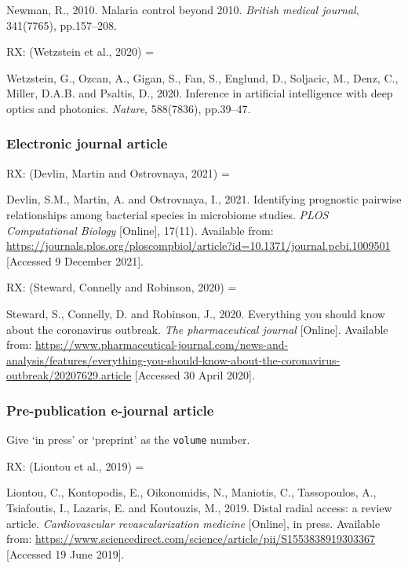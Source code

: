 Newman, R., 2010. Malaria control beyond 2010. \emph{British medical journal}, 341(7765), pp.157--208.


RX: (Wetzstein et al., 2020) = \cite{wetzstein.etal2020iai}

Wetzstein, G., Ozcan, A., Gigan, S., Fan, S., Englund, D., Soljacic, M., Denz, C., Miller, D.A.B. and Psaltis, D., 2020. Inference in artificial intelligence with deep optics and photonics. \emph{Nature}, 588(7836), pp.39--47.



\subsubsection*{Electronic journal article}

RX: (Devlin, Martin and Ostrovnaya, 2021) = \cite{devlin.etal2021ipp}

Devlin, S.M., Martin, A. and Ostrovnaya, I., 2021. Identifying prognostic pairwise relationships among bacterial species in microbiome studies. \emph{PLOS Computational Biology} [Online], 17(11). Available from: \url{https://journals.plos.org/ploscompbiol/article?id=10.1371/journal.pcbi.1009501} [Accessed 9 December 2021].


RX: (Steward, Connelly and Robinson, 2020) = \cite{steward.etal2020eys}

Steward, S., Connelly, D. and Robinson, J., 2020. Everything you should know about the coronavirus outbreak. \emph{The pharmaceutical journal} [Online]. Available from: \url{https://www.pharmaceutical-journal.com/news-and-analysis/features/everything-you-should-know-about-the-coronavirus-outbreak/20207629.article} [Accessed 30 April 2020].



\subsubsection*{Pre-publication e-journal article}

Give `in press' or `preprint' as the \texttt{volume} number.

RX: (Liontou et al., 2019) = \cite{liontou.etal2019dra}

Liontou, C., Kontopodis, E., Oikonomidis, N., Maniotis, C., Tassopoulos, A., Tsiafoutis, I., Lazaris, E. and Koutouzis, M., 2019. Distal radial access: a review article. \emph{Cardiovascular revascularization medicine} [Online], in press. Available from: \url{https://www.sciencedirect.com/science/article/pii/S1553838919303367} [Accessed 19 June 2019].



